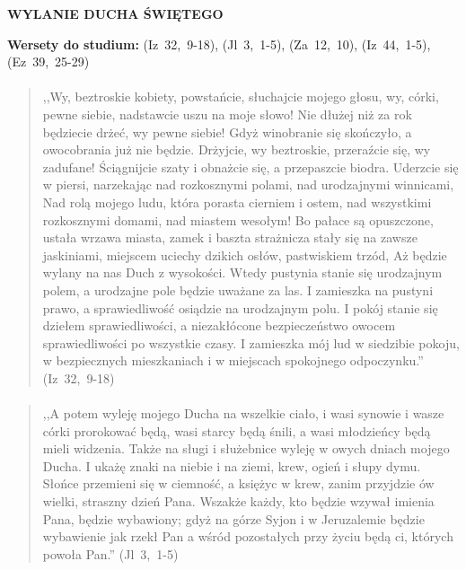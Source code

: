\documentclass[10pt,a4paper,oneside]{article}
\begin{document}
\centerline{\textbf{\MakeUppercase{Wylanie Ducha Świętego}}}
\begin{center}
\textbf{Wersety do studium:} 
\mbox{(Iz 32, 9-18)}, \mbox{(Jl 3, 1-5)}, \mbox{(Za 12, 10)}, \mbox{(Iz 44, 1-5)}, \mbox{(Ez 39, 25-29)}
\end{center}
\paragraph{}
\begin{quote}
,,Wy, beztroskie kobiety, powstańcie, słuchajcie mojego głosu, wy, córki, pewne siebie, nadstawcie uszu na moje słowo! Nie dłużej niż za rok będziecie drżeć, wy pewne siebie! Gdyż winobranie się skończyło, a owocobrania już nie będzie. Drżyjcie, wy beztroskie, przeraźcie się, wy zadufane! Ściągnijcie szaty i obnażcie się, a przepaszcie biodra. Uderzcie się w piersi, narzekając nad rozkosznymi polami, nad urodzajnymi winnicami, Nad rolą mojego ludu, która porasta cierniem i ostem, nad wszystkimi rozkosznymi domami, nad miastem wesołym! Bo pałace są opuszczone, ustała wrzawa miasta, zamek i baszta strażnicza stały się na zawsze jaskiniami, miejscem uciechy dzikich osłów, pastwiskiem trzód, Aż będzie wylany na nas Duch z wysokości. Wtedy pustynia stanie się urodzajnym polem, a urodzajne pole będzie uważane za las. I zamieszka na pustyni prawo, a sprawiedliwość osiądzie na urodzajnym polu. I pokój stanie się dziełem sprawiedliwości, a niezakłócone bezpieczeństwo owocem sprawiedliwości po wszystkie czasy. I zamieszka mój lud w siedzibie pokoju, w bezpiecznych mieszkaniach i w miejscach spokojnego odpoczynku.'' \mbox{(Iz 32, 9-18)}
\end{quote}
\paragraph{}
\begin{quote}
,,A potem wyleję mojego Ducha na wszelkie ciało, i wasi synowie i wasze córki prorokować będą, wasi starcy będą śnili, a wasi młodzieńcy będą mieli widzenia. Także na sługi i służebnice wyleję w owych dniach mojego Ducha. I ukażę znaki na niebie i na ziemi, krew, ogień i słupy dymu. Słońce przemieni się w ciemność, a księżyc w krew, zanim przyjdzie ów wielki, straszny dzień Pana. Wszakże każdy, kto będzie wzywał imienia Pana, będzie wybawiony; gdyż na górze Syjon i w Jeruzalemie będzie wybawienie jak rzekł Pan a wśród pozostałych przy życiu będą ci, których powoła Pan.'' \mbox{(Jl 3, 1-5)}
\end{quote}
\end{document}
